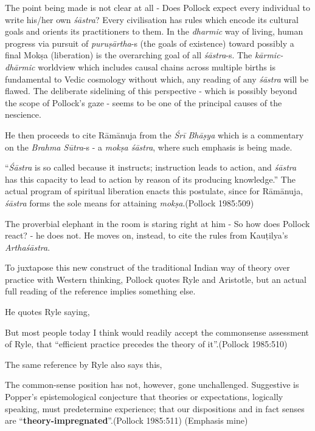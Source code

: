 The point being made is not clear at all - Does Pollock expect every individual to write his/her own {\sl śāstra}? Every civilisation has rules which encode its cultural goals and orients its practitioners to them. In the {\sl dharmic} way of living, human progress via pursuit of {\sl puruṣārtha}-s (the goals of existence) toward possibly a final Mokṣa (liberation) is the overarching goal of all {\sl śāstra}-s. The {\sl kārmic-dhārmic} worldview which includes causal chains across multiple births is fundamental to Vedic cosmology without which, any reading of any {\sl śāstra} will be flawed. The deliberate sidelining of this perspective - which is possibly beyond the scope of Pollock's gaze - seems to be one of the principal causes of the nescience.

He then proceeds to cite Rāmānuja from the {\sl Śrī Bhāṣya} which is a commentary on the {\sl Brahma Sūtra}-s - a {\sl mokṣa śāstra}, where such emphasis is being made.
\begin{myquote}
``{\sl Śāstra} is so called because it instructs; instruction leads to action, and {\sl śāstra} has this capacity to lead to action by reason of its producing knowledge.'' The actual program of spiritual liberation enacts this postulate, since for Rāmānuja, {\sl śāstra} forms the sole means for attaining {\sl mokṣa}.\hfill (Pollock 1985:509)
\end{myquote}

The proverbial elephant in the room is staring right at him - So how does Pollock react? - he does not. He moves on, instead, to cite the rules from Kauṭilya's {\sl Arthaśāstra}.

To juxtapose this new construct of the traditional Indian way of theory over practice with Western thinking, Pollock quotes Ryle and Aristotle, but an actual full reading of the reference implies something else.

He quotes Ryle saying,
\begin{myquote}
But most people today I think would readily accept the commonsense assessment of Ryle, that ``efficient practice precedes the theory of it''.\hfill (Pollock 1985:510)
\end{myquote}

The same reference by Ryle also says this,
\begin{myquote}
The common-sense position has not, however, gone unchallenged. Suggestive is Popper's epistemological conjecture that theories or expectations, logically speaking, must predetermine experience; that our dispositions and in fact senses are ``{\bf theory-impregnated}''.\hfill (Pollock 1985:511) (Emphasis mine)
\end{myquote}

